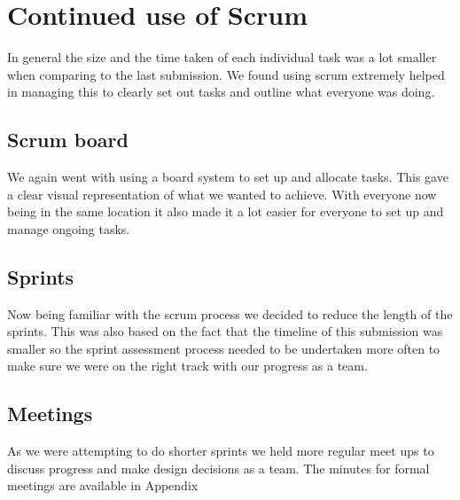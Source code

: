 \section{Continued use of Scrum}
In general the size and the time taken of each individual task was a lot smaller when comparing to the last submission. We found using scrum extremely helped in managing this to clearly set out tasks and outline what everyone was doing.
\subsection{Scrum board}
We again went with using a board system to set up and allocate tasks. This gave a clear visual representation of what we wanted to achieve. With everyone now being in the same location it also made it a lot easier for everyone to set up and manage ongoing tasks.
\subsection{Sprints}
Now being familiar with the scrum process we decided to reduce the length of the sprints. This was also based on the fact that the timeline of this submission was smaller so the sprint assessment process needed to be undertaken more often to make sure we were on the right track with our progress as a team.
\subsection{Meetings}
As we were attempting to do shorter sprints we held more regular meet ups to discuss progress and make design decisions as a team.
The minutes for formal meetings are available in Appendix
